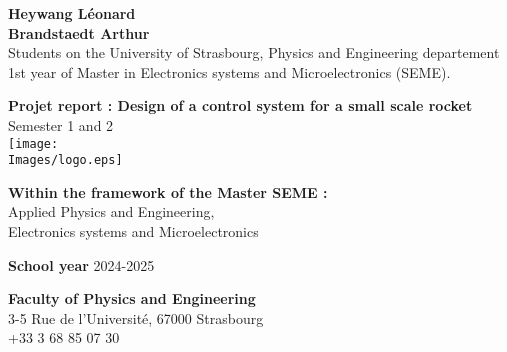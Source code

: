 \begin{titlepage}
	\raggedright
	\textbf{Heywang Léonard}	\\
    \textbf{Brandstaedt Arthur}  \\
	Students on the University of Strasbourg, Physics and Engineering departement\\
	1st year of Master in Electronics systems and Microelectronics (SEME).

	\raggedleft

	\centering
	\vspace{3cm}

	\huge
	\textbf{Projet report : Design of a control system for a small scale rocket}\\
	Semester 1 and 2\\
    \vspace{0.5cm}
	\texttt{[image: \\Images/logo.eps]}

	\raggedright
	\normalsize
	\vspace{3cm}
	\textbf{Within the framework of the Master SEME :}\\
	Applied Physics and Engineering, \\
	Electronics systems and Microelectronics

	\vspace{1.5cm}
	\textbf{School year} 2024-2025

	\vspace{1.5cm}
	\textbf{Faculty of Physics and Engineering}\\
	3-5 Rue de l'Université, 67000 Strasbourg\\
	+33 3 68 85 07 30

	\vspace{1 cm}
	\centering
	\begin{figure}[!ht]%
		\centering
		\qquad
	\end{figure}
\end{titlepage}
